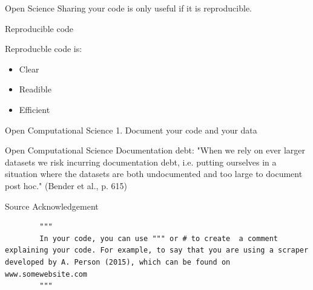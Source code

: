 \documentclass[compress]{beamer}
\begin{document}
\begin{frame}[fragile]{Open Science} 	
	Sharing your code is only useful if it is reproducible.
\end{frame}

\begin{frame}{Reproducible code}
	\begin{alertblock}{Reproducble code is:}
		\begin{itemize}
			\item Clear
			\item Readible
			\item Efficient
		\end{itemize}
	\end{alertblock}
\end{frame}




\begin{frame}{Open Computational Science}
	1. Document your code and your data
\end{frame}

\begin{frame}{Open Computational Science}
	Documentation debt: "When we rely on ever larger datasets we risk incurring documentation debt, i.e. putting ourselves in a situation where the datasets are both undocumented and too large to document post hoc." (Bender et al., p. 615)
	
\end{frame}

\begin{frame}[fragile]{Source Acknowledgement}
	
	\begin{lstlisting}		
		"""
		In your code, you can use """ or # to create  a comment explaining your code. For example, to say that you are using a scraper developed by A. Person (2015), which can be found on www.somewebsite.com
		"""
	\end{lstlisting}
\end{frame}
\end{document}
